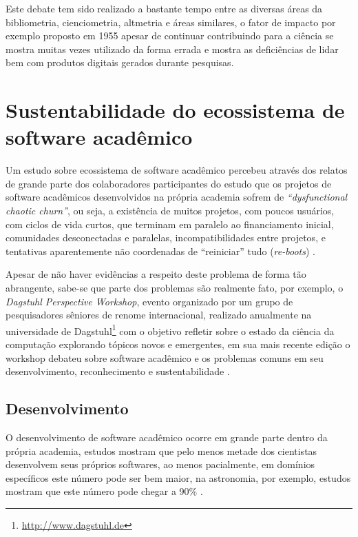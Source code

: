 Este debate tem sido realizado a bastante tempo entre as diversas áreas da
bibliometria, cienciometria, altmetria e áreas similares, o fator de impacto
por exemplo proposto em 1955 apesar de continuar contribuindo para a ciência se
mostra muitas vezes utilizado da forma errada e mostra as deficiências de lidar
bem com produtos digitais gerados durante pesquisas.

\section{Sustentabilidade do ecossistema de software acadêmico}


Um estudo sobre ecossistema de software acadêmico percebeu através dos relatos
de grande parte dos colaboradores participantes do estudo que os projetos de software
acadêmicos desenvolvidos na própria academia sofrem de {\it ``dysfunctional
chaotic churn''}, ou seja, a existência de muitos projetos, com poucos
usuários, com ciclos de vida curtos, que terminam em paralelo ao financiamento
inicial, comunidades desconectadas e paralelas, incompatibilidades entre
projetos, e tentativas aparentemente não coordenadas de ``reiniciar'' tudo
({\it re-boots}) \cite{howison2015understanding}.

Apesar de não haver evidências a respeito deste problema de forma tão abrangente,
sabe-se que parte dos problemas são realmente fato, por exemplo,
o {\it Dagstuhl Perspective Workshop}, evento organizado por um grupo de
pesquisadores sêniores de renome internacional, realizado anualmente na
universidade de Dagstuhl\footnote{\url{http://www.dagstuhl.de}} com o objetivo
refletir sobre o estado da ciência da computação explorando tópicos novos e
emergentes, em sua mais recente edição o workshop debateu sobre software
acadêmico e os problemas comuns em seu desenvolvimento, reconhecimento e
sustentabilidade \cite{allen2017engineering}.

\subsection{Desenvolvimento}

O desenvolvimento de software acadêmico ocorre em grande parte dentro da
própria academia, estudos mostram que pelo menos metade dos cientistas desenvolvem
seus próprios softwares, ao menos pacialmente, em domínios específicos este
número pode ser bem maior, na astronomia, por exemplo, estudos mostram que este
número pode chegar a 90\% \cite{hettrick_2014_14809, momcheva2015software}.

